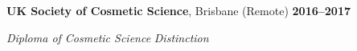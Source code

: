 \textbf{\large UK Society of Cosmetic Science}, {\large Brisbane (Remote)} \hfill \textbf{2016--2017} \par
\textit{Diploma of Cosmetic Science} \hfill \textit{Distinction}\par